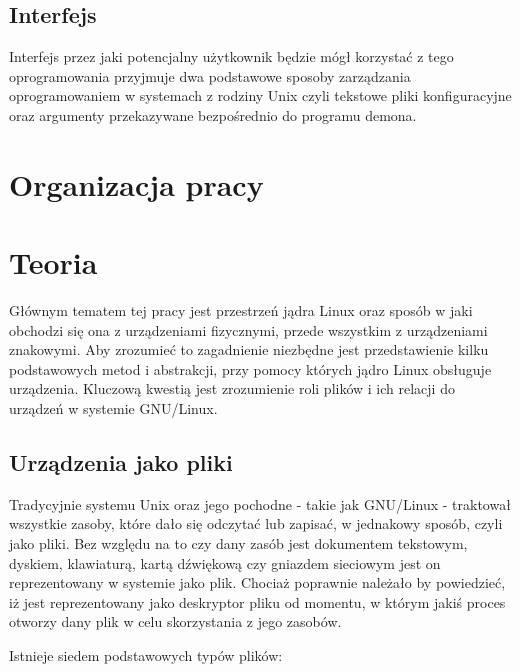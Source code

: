 \documentclass[10pt]{scrartcl}
\begin{document}
\subsection{Interfejs}

Interfejs przez jaki potencjalny użytkownik będzie mógł korzystać z tego oprogramowania przyjmuje dwa podstawowe sposoby zarządzania oprogramowaniem w systemach z rodziny Unix czyli tekstowe pliki konfiguracyjne oraz argumenty przekazywane bezpośrednio do programu
demona.

\section{Organizacja pracy}


\section{Teoria}
\label{theory}

Głównym tematem tej pracy jest przestrzeń jądra Linux oraz sposób w jaki obchodzi się ona z urządzeniami fizycznymi, przede wszystkim z urządzeniami znakowymi. Aby zrozumieć to zagadnienie niezbędne jest przedstawienie kilku podstawowych metod i abstrakcji, przy pomocy których jądro Linux obsługuje urządzenia. Kluczową kwestią jest zrozumienie roli plików i ich relacji do urządzeń w systemie GNU/Linux.

\subsection{Urządzenia jako pliki}
\label{devasfiles}

Tradycyjnie systemu Unix oraz jego pochodne - takie jak GNU/Linux - traktował wszystkie zasoby, które dało się odczytać lub zapisać, w jednakowy sposób, czyli jako pliki. Bez względu na to czy dany zasób jest dokumentem tekstowym, dyskiem, klawiaturą, kartą dźwiękową czy gniazdem sieciowym jest on reprezentowany w systemie jako plik. Chociaż poprawnie należało by powiedzieć, iż jest reprezentowany jako deskryptor pliku od momentu, w którym jakiś proces otworzy dany plik w celu skorzystania z jego zasobów.

Istnieje siedem podstawowych typów plików:
\end{document}
